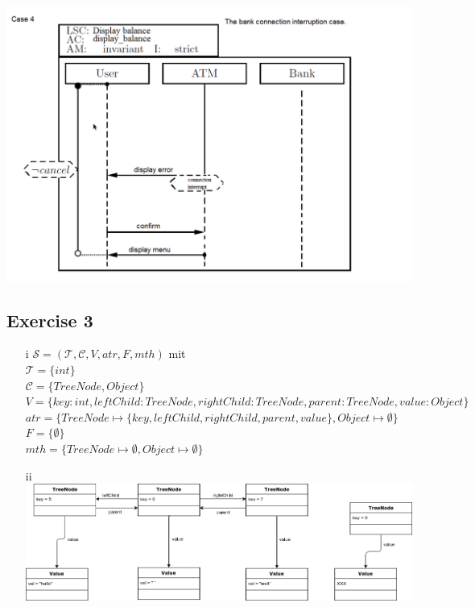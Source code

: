 \documentclass{scrartcl}
\begin{document}
\includegraphics[width=\textwidth]{Aufgabe2_LSC4.png} \\



\subsection*{Exercise 3}

\begin{itemize}
   \item [i]
        $\mathscr{S} = (\mathscr{T}, \mathscr{C}, V, atr, F, mth)$ mit \\
        $\mathscr{T} = \{int\}$ \\
        $\mathscr{C} = \{TreeNode, Object\}$ \\
        $V = \{key : int, leftChild : TreeNode, rightChild : TreeNode, parent : TreeNode, value : Object \}$ \\
        $atr = \{ TreeNode \mapsto \{key, leftChild, rightChild, parent, value\}, Object \mapsto \emptyset \}$ \\
        $F = \{ \emptyset \}$ \\
        $mth = \{ TreeNode \mapsto \emptyset, Object \mapsto \emptyset \}$
    \item[ii]
        \includegraphics[width=\textwidth]{NodeExample.png}
\end{itemize}
\end{document}
